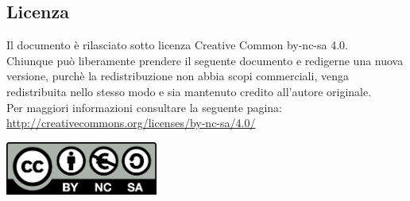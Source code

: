 \subsection{Licenza}
Il documento è rilasciato sotto licenza Creative Common by-nc-sa 4.0. \\
Chiunque può liberamente prendere il seguente documento e redigerne una nuova
versione, purchè la redistribuzione non abbia scopi commerciali,
venga redistribuita nello stesso modo e sia mantenuto credito all’autore
originale. \\
Per maggiori informazioni consultare la seguente pagina: \\
\url{http://creativecommons.org/licenses/by-nc-sa/4.0/}
\begin{center}
\includegraphics[width=50mm]{analisi/img/by-nc-sa.png}
\end{center}
